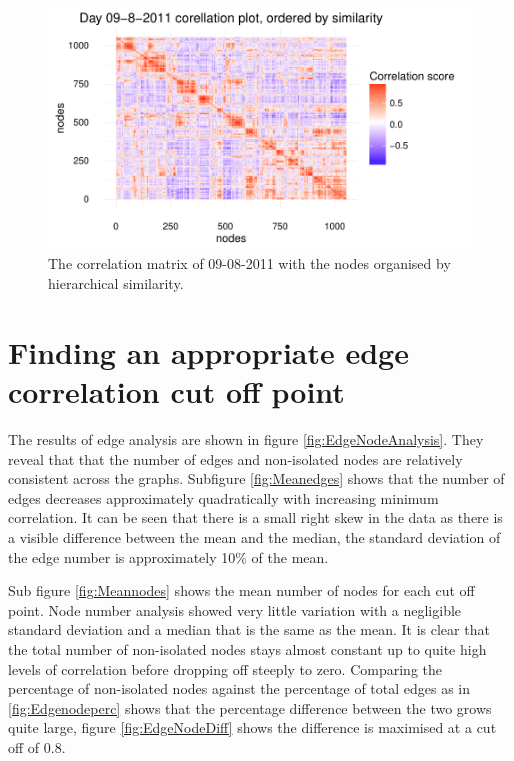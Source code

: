 \begin{figure}
    \centering
    \includegraphics[width=\textwidth]{Figures/Results/day100Corplot}
    \caption[Example corellation matrix]{The correlation matrix of 09-08-2011 with the nodes organised by hierarchical similarity.}
    \label{fig:day100corplot}
\end{figure}

\section{Finding an appropriate  edge correlation cut off point}
The results of edge analysis are shown in figure \ref{fig:EdgeNodeAnalysis}. They reveal that that the number of edges and non-isolated nodes are relatively consistent across the graphs. Subfigure \ref{fig:Meanedges} shows that the number of edges decreases approximately quadratically with increasing minimum correlation. It can be seen that there is a small right skew in the data as there is a visible difference between the mean and the median, the standard deviation of the edge number is approximately 10\% of the mean. 

Sub figure \ref{fig:Meannodes} shows the mean number of nodes for each cut off point. Node number analysis showed very little variation with a negligible standard deviation and a median that is the same as the mean. It is clear that the total number of non-isolated nodes stays almost constant up to quite high levels of correlation before dropping off steeply to zero. Comparing the percentage of non-isolated nodes against the percentage of total edges as in \ref{fig:Edgenodeperc} shows that the percentage difference between the two grows quite large, figure \ref{fig:EdgeNodeDiff} shows the difference is maximised at a cut off of 0.8. 

